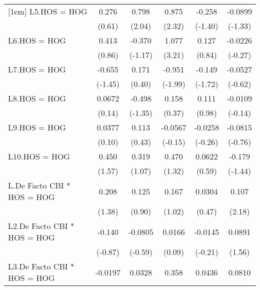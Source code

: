 {\begin{tabular}{l*{5}{c}}
[1em]
L5.HOS = HOG    &    0.276         &    0.798\sym{*}  &    0.875\sym{*}  &   -0.258         &  -0.0899         \\
                &   (0.61)         &   (2.04)         &   (2.32)         &  (-1.40)         &  (-1.33)         \\
[1em]
L6.HOS = HOG    &    0.413         &   -0.370         &    1.077\sym{**} &    0.127         &  -0.0226         \\
                &   (0.86)         &  (-1.17)         &   (3.21)         &   (0.84)         &  (-0.27)         \\
[1em]
L7.HOS = HOG    &   -0.655         &    0.171         &   -0.951\sym{*}  &   -0.149         &  -0.0527         \\
                &  (-1.45)         &   (0.40)         &  (-1.99)         &  (-1.72)         &  (-0.62)         \\
[1em]
L8.HOS = HOG    &   0.0672         &   -0.498         &    0.158         &    0.111         &  -0.0109         \\
                &   (0.14)         &  (-1.35)         &   (0.37)         &   (0.98)         &  (-0.14)         \\
[1em]
L9.HOS = HOG    &   0.0377         &    0.113         &  -0.0567         &  -0.0258         &  -0.0815         \\
                &   (0.10)         &   (0.43)         &  (-0.15)         &  (-0.26)         &  (-0.76)         \\
[1em]
L10.HOS = HOG   &    0.450         &    0.319         &    0.470         &   0.0622         &   -0.179         \\
                &   (1.57)         &   (1.07)         &   (1.32)         &   (0.59)         &  (-1.44)         \\
[1em]
L.De Facto CBI * HOS = HOG&    0.208         &    0.125         &    0.167         &   0.0304         &    0.107\sym{*}  \\
                &   (1.38)         &   (0.90)         &   (1.02)         &   (0.47)         &   (2.18)         \\
[1em]
L2.De Facto CBI * HOS = HOG&   -0.140         &  -0.0805         &   0.0166         &  -0.0145         &   0.0891         \\
                &  (-0.87)         &  (-0.59)         &   (0.09)         &  (-0.21)         &   (1.56)         \\
[1em]
L3.De Facto CBI * HOS = HOG&  -0.0197         &   0.0328         &    0.358\sym{*}  &   0.0436         &   0.0810         \\

\end{tabular}}
